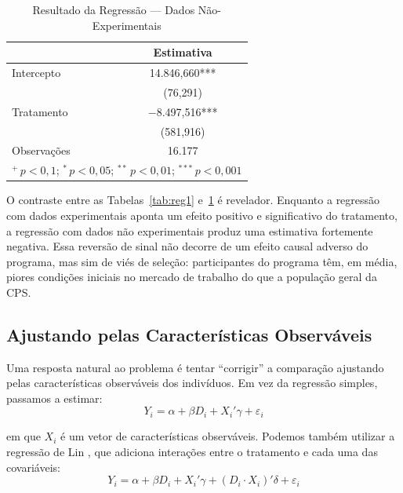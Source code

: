 \documentclass[12pt,a4paper]{article}
\begin{document}
\begin{table}[H]
\centering
\caption{Resultado da Regressão --- Dados Não-Experimentais}\label{tab:reg2}
\begin{tabular}{lc}
\toprule
 & Estimativa \\
\midrule
Intercepto \hspace{60mm} & 14.846,660*** \\
 & (76,291) \\
Tratamento & $-$8.497,516*** \\
 & (581,916) \\
Observações & 16.177 \\
\bottomrule
\multicolumn{2}{l}{\footnotesize $^{+}\,p<0{,}1$;\; $^{*}\,p<0{,}05$;\; $^{**}\,p<0{,}01$;\; $^{***}\,p<0{,}001$}\\
\end{tabular}
\end{table}

O contraste entre as Tabelas~\ref{tab:reg1} e~\ref{tab:reg2} é revelador. Enquanto a regressão com dados experimentais aponta um efeito positivo e significativo do tratamento, a regressão com dados não experimentais produz uma estimativa fortemente negativa. Essa reversão de sinal não decorre de um efeito causal adverso do programa, mas sim de viés de seleção: participantes do programa têm, em média, piores condições iniciais no mercado de trabalho do que a população geral da CPS.

\subsection{Ajustando pelas Características Observáveis}

Uma resposta natural ao problema é tentar ``corrigir'' a comparação ajustando pelas características observáveis dos indivíduos. Em vez da regressão simples, passamos a estimar:
\begin{equation}\label{eq:olscov}
    Y_i = \alpha + \beta D_i + X_i'\gamma + \varepsilon_i
\end{equation}

em que $X_i$ é um vetor de características observáveis. Podemos também utilizar a regressão de Lin \citep{LinRegression2013}, que adiciona interações entre o tratamento e cada uma das covariáveis:
\begin{equation}\label{eq:olslin}
    Y_i = \alpha + \beta D_i + X_i' \gamma + (D_i \cdot X_i)' \delta + \varepsilon_i
\end{equation}
\end{document}
